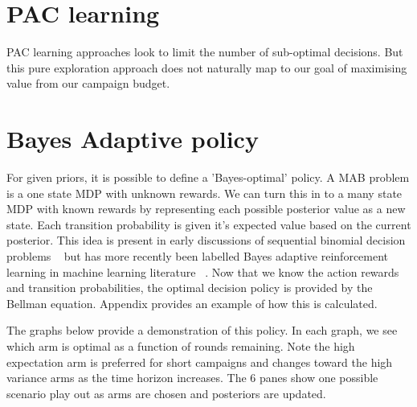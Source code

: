 \documentclass[11pt,a4,singlespacing,titlepagenumber=on]{scrreprt}
\numberwithin{equation}{chapter} %
\theoremstyle{remark}
\begin{document}
\section{PAC learning}

PAC learning approaches look to limit the number of sub-optimal decisions. But this pure exploration approach does not naturally map to our goal of maximising value from our campaign budget.

\section{ Bayes Adaptive policy }

For given priors, it is possible to define a 'Bayes-optimal' policy. A MAB problem is a one state MDP with unknown rewards. We can turn this in to a many state MDP with known rewards by representing each possible posterior value as a new state. Each transition probability is given it's expected value based on the current posterior. This idea is present in early discussions of sequential binomial decision problems ~\cite{chernoff1965bayes} but has more recently been labelled Bayes adaptive reinforcement learning in machine learning literature ~\cite{duff2002optimal}. Now that we know the action rewards and transition probabilities, the optimal decision policy is provided by the Bellman equation. Appendix provides an example of how this is calculated.

The graphs below provide a demonstration of this policy. In each graph, we see which arm is optimal as a function of rounds remaining. Note the high expectation arm is preferred for short campaigns and changes toward the high variance arms as the time horizon increases. The 6 panes show one possible scenario play out as arms are chosen and posteriors are updated.
\end{document}
